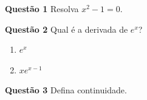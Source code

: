\documentclass{article}
\begin{document}
\noindent\textbf{Questão 1} Resolva $x^2-1=0$.

\noindent\textbf{Questão 2} Qual é a derivada de $e^x$?
\begin{enumerate}[label=\alph*)]
\item $e^x$ \correta
\item $xe^{x-1}$
\end{enumerate}

\noindent\textbf{Questão 3} Defina continuidade.
\end{document}
